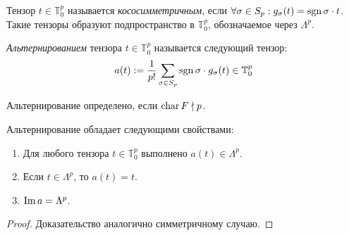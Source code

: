 \begin{definition}
	Тензор $t \in \mathbb{T}^p_0$ называется \textit{кососимметричным}, если $\forall \sigma \in S_p: g_\sigma(t) \hm= \sgn\sigma\cdot t$. Такие тензоры образуют подпространство в $\mathbb{T}^p_0$, обозначаемое через $\Lambda^p$.
\end{definition}

\begin{definition}
	\textit{Альтернированием} тензора $t \in \mathbb{T}^p_0$ называется следующий тензор:
	\[a(t) := \frac1{p!}\sum_{\sigma \in S_p}\operatorname{sgn}\sigma\cdot g_\sigma(t) \in \mathbb{T}^p_0\]
	
	Альтернирование определено, если $\operatorname{char}{F} \nmid p$.
\end{definition}

\begin{proposition} 
	Альтернирование обладает следующими свойствами:
	\begin{enumerate}
		\item Для любого тензора $t \in \mathbb{T}^p_0$ выполнено $a(t) \in \Lambda^p$.
		\item Если $t \in \Lambda^p$, то $a(t) = t$.
		\item $\operatorname{Im}{a} = \Lambda^p$.
	\end{enumerate}
\end{proposition}

\begin{proof}
	Доказательство аналогично симметричному случаю.
\end{proof}
